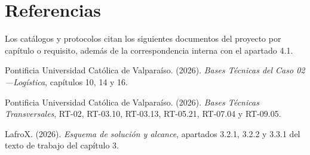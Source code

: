 \section*{Referencias}
Los catálogos y protocolos citan los siguientes documentos del proyecto por capítulo o requisito, además de la correspondencia interna con el apartado 4.1.

Pontificia Universidad Católica de Valparaíso. (2026). \textit{Bases Técnicas del Caso 02---Logística}, capítulos 10, 14 y 16.

Pontificia Universidad Católica de Valparaíso. (2026). \textit{Bases Técnicas Transversales}, RT-02, RT-03.10, RT-03.13, RT-05.21, RT-07.04 y RT-09.05.

LafroX. (2026). \textit{Esquema de solución y alcance}, apartados 3.2.1, 3.2.2 y 3.3.1 del texto de trabajo del capítulo 3.

